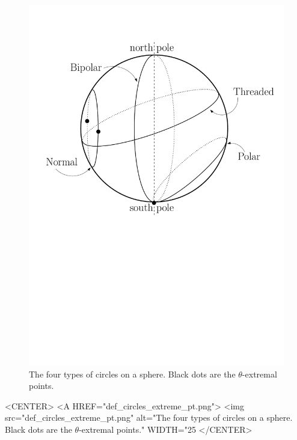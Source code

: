 \begin{ccTexOnly}
\begin{figure}[ht!]
\centerline{
 \includegraphics[height=.5\textwidth]{Circular_kernel_3/def_circles_extreme_pt}
}
\caption{The four types of circles on a sphere. Black dots
  are the $\theta$-extremal points.  \label{fig-def-circles}}
\end{figure}
\end{ccTexOnly}


\begin{ccHtmlOnly}
    <CENTER>
    <A HREF="def_circles_extreme_pt.png">
        <img src="def_circles_extreme_pt.png" alt="The four types of circles on a sphere. Black dots are the $\theta$-extremal points." WIDTH="25%
    </CENTER>
\end{ccHtmlOnly}






